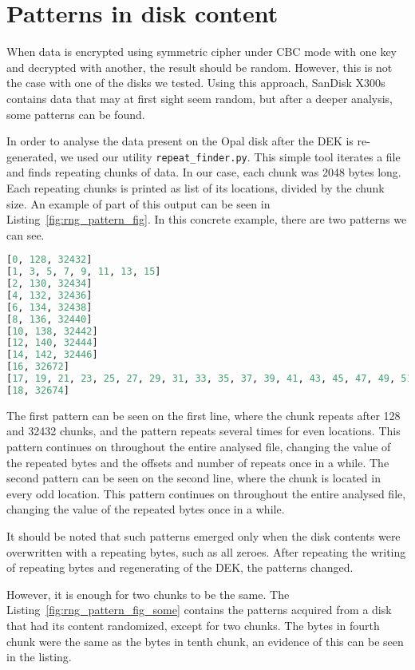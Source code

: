 \chapter{Patterns in disk content}
\label{appendix:rng_pattern}

When data is encrypted using symmetric cipher under CBC mode with one key and decrypted with another, the result should be random.
However, this is not the case with one of the disks we tested. Using this approach, SanDisk X300s contains data that may at first sight seem random, but after a deeper analysis, some patterns can be found.

In order to analyse the data present on the Opal disk after the DEK is re-generated, we used our utility \verb|repeat_finder.py|. This simple tool iterates a file and finds repeating chunks of data. In our case, each chunk was 2048 bytes long. Each repeating chunks is printed as list of its locations, divided by the chunk size. An example of part of this output can be seen in Listing~\ref{fig:rng_pattern_fig}. In this concrete example, there are two patterns we can see.

\begin{lstlisting}[caption={Found patterns on zeroed disk},label={fig:rng_pattern_fig},language=Python]
[0, 128, 32432]
[1, 3, 5, 7, 9, 11, 13, 15]
[2, 130, 32434]
[4, 132, 32436]
[6, 134, 32438]
[8, 136, 32440]
[10, 138, 32442]
[12, 140, 32444]
[14, 142, 32446]
[16, 32672]
[17, 19, 21, 23, 25, 27, 29, 31, 33, 35, 37, 39, 41, 43, 45, 47, 49, 51, 53, 55]
[18, 32674]
    \end{lstlisting}
The first pattern can be seen on the first line, where the chunk repeats after 128 and 32432 chunks, and the pattern repeats several times for even locations. This pattern continues on throughout the entire analysed file, changing the value of the repeated bytes and the offsets and number of  repeats  once in a while.
The second pattern can be seen on the second line, where the chunk is located in every odd location. This pattern continues on throughout the entire analysed file, changing the value of the repeated bytes once in a while.

It should be noted that such patterns emerged only when the disk contents were overwritten with a repeating bytes, such as all zeroes. After repeating the writing of repeating bytes and regenerating of the DEK, the patterns changed. 

However, it is enough for two chunks to be the same. The Listing~\ref{fig:rng_pattern_fig_some} contains the patterns acquired from a disk that had its content randomized, except for two chunks. The bytes in fourth chunk were the same as the bytes in tenth chunk, an evidence of this can be seen in the listing.

